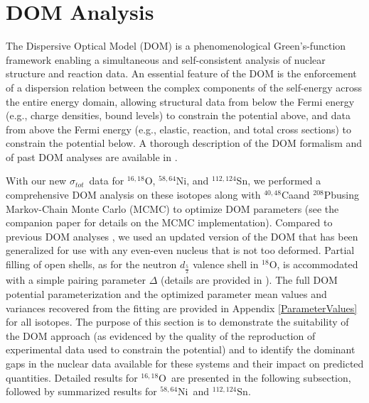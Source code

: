 \documentclass[twocolumn,secnumarabic,amssymb, nobibnotes, aps, prl,
superscriptaddress, nobalancelastpage]{revtex4}
\newcommand{\tot}{\ensuremath{\sigma_{tot}}}
\newcommand{\oEight}{\ensuremath{^{18}}O}
\newcommand{\oSixEight}{\ensuremath{^{16,18}}O}
\newcommand{\caAughtEight}{\ensuremath{^{40,48}}C\lowercase{a}}
\newcommand{\niEightFour}{\ensuremath{^{58,64}}N\lowercase{i}}
\newcommand{\snTwelveFour}{\ensuremath{^{112,124}}S\lowercase{n}}
\newcommand{\pbEight}{\ensuremath{^{208}}P\lowercase{b}}
\begin{document}
\section{DOM Analysis}

The Dispersive Optical Model (DOM) is a phenomenological Green's-function
framework enabling a simultaneous and self-consistent analysis of nuclear
structure and reaction data.
An essential feature of the DOM is the enforcement of a dispersion
relation between the complex components of the self-energy across the entire
energy domain, allowing structural data from below the Fermi energy
(e.g., charge densities, bound levels) to constrain the potential above,
and data from above the Fermi energy (e.g., elastic, reaction, and total
cross sections) to constrain the potential
below. A thorough description of the DOM formalism and of past DOM analyses are
available in \cite{Mahaux1991, Dickhoff2018, PruittPhDThesis, AtkinsonPhDThesis, MahzoonPhDThesis}.

With our new \tot\ data for \oSixEight, \niEightFour, and \snTwelveFour, we
performed a comprehensive DOM analysis on these isotopes along with
\caAughtEight and \pbEight using Markov-Chain Monte Carlo
(MCMC) to optimize DOM parameters (see the companion paper
\cite{Pruitt2020PRL} for details on the MCMC implementation). Compared to previous DOM analyses
\cite{Mueller2011, AtkinsonPhDThesis, MahzoonPhDThesis}, we used an updated version of the DOM
that has been generalized for use with any even-even nucleus that is not too
deformed. Partial filling of open shells, as for the neutron $d_{\frac{5}{2}}$
valence shell in \oEight, is accommodated with a simple
pairing parameter $\Delta$ (details are provided in \cite{PruittPhDThesis}).
The full DOM potential parameterization and the optimized parameter mean values
and variances recovered from the fitting are provided in Appendix
\ref{ParameterValues} for all isotopes. The purpose of this section is to
demonstrate the suitability of the DOM approach (as evidenced by the quality of
the reproduction of experimental data used to constrain the potential) and to
identify the dominant gaps in the nuclear data available for these systems
and their impact on predicted quantities. Detailed results for \oSixEight\ are presented
in the following subsection, followed by summarized results for \niEightFour\ and
\snTwelveFour.
\end{document}
